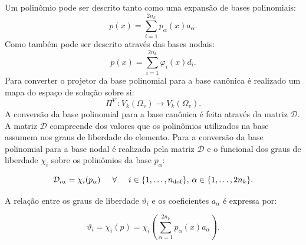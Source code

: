     \indent Um polinômio pode ser descrito tanto como uma expansão de bases polinomiais: $$p(x) = \sum_{i=1}^{2n_k} p_\alpha (x) a_\alpha.$$ Como também pode ser descrito através das bases nodais: $$p(x) = \sum_{i=1}^{2n_k} \varphi_i (x) d_i.$$ Para converter o projetor da base polinomial para a base canônica é realizado um mapa do espaço de solução sobre si: $$\Pi^{\nabla}: V_k(\Omega_v) \rightarrow V_k(\Omega_v).$$ A conversão da base polinomial para a base canônica é feita através da matriz $\mathcal{D}$.\\
    \indent A matriz $\mathcal{D}$ compreende dos valores que os polinômios utilizados na base assumem nos graus de liberdade do elemento. Para a conversão da base polinomial para a base nodal é realizada pela matriz $\mathcal{D}$ e o funcional dos graus de liberdade $\chi_i$ sobre os polinômios da base $p_\alpha$:
    
    \begin{equation}
        \mathcal{D}_{i\alpha} = \chi_i(p_\alpha) \hspace{5mm} \forall \hspace{5mm} i \in \{1, \ldots, n_{\mathrm{dof}} \}, \, \alpha \in \{ 1, \ldots, 2n_k \}.
        \label{eq:4.34}
    \end{equation}

    \vspace{5mm}
    \vspace{5mm}

    \indent A relação entre os graus de liberdade $\vartheta_i$ e os coeficientes $a_\alpha$ é expressa por: 
    
    \begin{equation}
        \vartheta_i = \chi_i(p) = \chi_i \left( \sum_{\alpha=1}^{2n_k} p_\alpha (x) a_\alpha \right).
        \label{eq:4.35}
    \end{equation}

